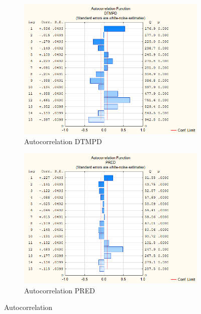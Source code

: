 \documentclass[12pt,a4paper]{article}
\begin{document}
\begin{figure}
	\centering
\begin{subfigure}[b]{0.45\textwidth}
	\centering
	\includegraphics[width=\linewidth]{"../Assignment 2/Autocorrelation DTMPD"}
	\caption{Autocorrelation DTMPD}
	\label{fig:autocorrelation-dtmpd}
\end{subfigure}
\begin{subfigure}[b]{0.45\textwidth}
	\centering
	\includegraphics[width=\linewidth]{"../Assignment 2/Autocorrelation PRED"}
	\caption{Autocorrelation PRED}
	\label{fig:autocorrelation-pred}
\end{subfigure}
\caption{Autocorrelation}\label{fig:trapez2}
\end{figure}
\end{document}
